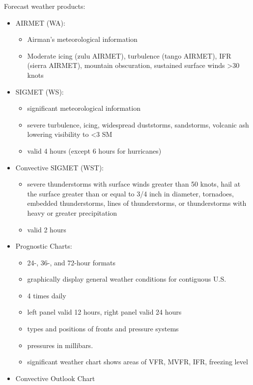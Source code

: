\documentclass[twoside,openright]{report}
\begin{document}
Forecast weather products:

\begin{itemize}
  \item AIRMET (WA):
    \begin{itemize}
      \item Airman's meteorological information
      \item Moderate icing (zulu AIRMET), turbulence (tango AIRMET), IFR
        (sierra AIRMET), mountain obscuration, sustained surface winds >30
        knots
    \end{itemize}
  \item SIGMET (WS):
    \begin{itemize}
      \item significant meteorological information
      \item severe turbulence, icing, widespread duststorms, sandstorms,
        volcanic ash lowering visibility to <3 SM
      \item valid 4 hours (except 6 hours for hurricanes)
    \end{itemize}
  \item Convective SIGMET (WST):
    \begin{itemize}
      \item severe thunderstorms with surface winds greater than 50 knots, hail
        at the surface greater than or equal to 3/4 inch in diameter,
        tornadoes, embedded thunderstorms, lines of thunderstorms, or
        thunderstorms with heavy or greater precipitation
      \item valid 2 hours
    \end{itemize}
  \item Prognostic Charts:
    \begin{itemize}
      \item 24-, 36-, and 72-hour formats
      \item graphically display general weather conditions for contiguous U.S.
      \item 4 times daily
      \item left panel valid 12 hours, right panel valid 24 hours
      \item types and positions of fronts and pressure systems
      \item pressures in millibars.
      \item significant weather chart shows areas of VFR, MVFR, IFR, freezing
        level
    \end{itemize}
  \item Convective Outlook Chart

\end{itemize}
\end{document}
